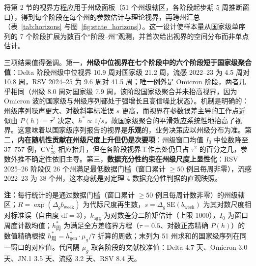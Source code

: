 \documentclass[11pt,a4paper]{article}
\theoremstyle{plain}
\theoremstyle{definition}
\begin{document}
将第 2 节的视界方程应用于州级面板（51 个州级辖区，各阶段起步期 5 周推断窗口），得到每个阶段在每个州的参数估计与理论视界，再跨州汇总（表~\ref{tab:horizons} 与图~\ref{fig:state_horizons}）。这一设计使样本量从国家级单序列的 7 个阶段扩展为数百个“阶段--州”观测，并首次给出视界的空间分布而非单点估计。

三项结果值得强调。第一，\textbf{州级中位视界在七个阶段中的六个阶段短于国家级聚合值}：Delta 阶段州级中位视界 10.9 周对国家级 21.2 周，流感 2022--23 为 4.5 周对 10.8 周，RSV 2024--25 为 9.6 周对 41.5 周；唯一例外是 Omicron 阶段，两者几乎相同（州级 8.0 周对国家级 7.9 周，该阶段国家级聚合并未抬高视界，因为 Omicron 波的国家级与州级序列都处于强增长且高信噪比状态）。机制是明确的：州级序列噪声更大、对数斜率标准误 $s$ 更高，而视界在参数误差主导的工作点近似由 $P(h)=\tau^2$ 决定、$h^* \propto 1/s$，故国家级聚合的平滑效应系统性地抬高了视界。这意味着以国家级序列报告的视界是\textbf{乐观}的，业务决策应以州级分布为准。第二，\textbf{内在随机性贡献在州级尺度上升但仍是次要项}：州级窗口均值 $I_0$ 中位数降至 37--757 例，$\text{CV}^2_\infty$ 相应抬升，但在各阶段视界工作点处仍只占 $\tau^2$ 的百分之几，参数外推不确定性依旧主导。第三，\textbf{数据充分性约束在州级尺度上显性化}：RSV 2025--26 阶段仅 26 个州满足最低数据门槛（窗口累计 $\ge 50$ 例且每周非零），流感 2022--23 为 38 个州，这本身就是对定理 4 数据充分性判据的直观映照。

\begin{table}[htbp]
\centering
\footnotesize
\caption{州级面板各阶段动力学参数与理论可预测视界分布（中位数与四分位距）}
\label{tab:horizons}
\resizebox{\textwidth}{!}{%
%
}
\vspace{2pt}
\begin{flushleft}
\scriptsize \textbf{注：}每行统计的是通过数据门槛（窗口累计 $\ge 50$ 例且每周计数非零）的州级辖区；$R=\exp(\Delta_g b_{\text{week}})$ 为代际尺度再生数，$s = \Delta_g\,\text{SE}(b_{\text{week}})$ 为其对数尺度相对标准误（自由度 $\text{df}=3$），$k_{\text{agg}}$ 为对数差分二阶矩估计（上限 1000），$I_0$ 为窗口周度计数均值；$h^*_{\text{周}}$ 为满足全方差临界方程（$\tau=0.5$、对数正态精确 $P(h)$）的数值精确根按 $h^*_{\text{周}} = h^*_{\text{gen}} \cdot \mu_g/7$ 折算的周数；末列为 51 州求和的国家级序列在同一窗口的对应值。代间隔 $\mu_g$ 取各阶段的文献校准值：Delta 4.7 天\citep{hart2022generation}、Omicron 3.0 天\citep{park2023inferring}、JN.1 3.5 天\citep{chan2026estimating}、流感 3.2 天\citep{chan2025influenza}、RSV 8.4 天\citep{cohen2024respiratory}。\end{flushleft}
\end{table}
\end{document}
